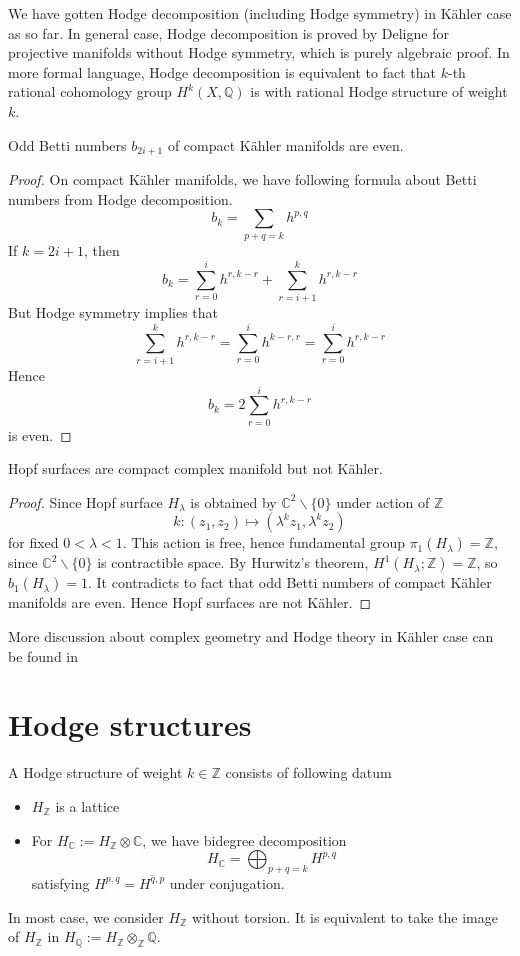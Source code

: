 \documentclass[11pt,oneside,a4paper]{amsbook}
\begin{document}
We have gotten Hodge decomposition (including Hodge symmetry) in K\"ahler case as so far. In general case, Hodge decomposition is proved by Deligne for projective manifolds without Hodge symmetry, which is purely algebraic proof. In more formal language, Hodge decomposition is equivalent to fact that $k$-th rational cohomology group $H^k(X, \mathbb{Q})$ is with rational Hodge structure of weight $k$.
\begin{secprop}
	Odd Betti numbers $b_{2i+1}$ of compact K\"ahler manifolds are even.
\end{secprop}
\begin{proof}
	On compact K\"ahler manifolds, we have following formula about Betti numbers from Hodge decomposition.
	\begin{equation}
		b_{k}= \sum_{p+q=k}h^{p,q}
	\end{equation}
	If $k=2i+1$, then 
	\[
	b_{k}= \sum_{r=0}^{i}h^{r,k-r} + \sum_{r=i+1}^{k}h^{r,k-r}
	\]
	But Hodge symmetry implies that 
	\[
	\sum_{r=i+1}^{k}h^{r,k-r}= \sum_{r=0}^{i}h^{k-r,r} =\sum_{r=0}^{i}h^{r,k-r}
	\]
	Hence 
	\[
	b_k= 2\sum_{r=0}^{i}h^{r,k-r}
	\]
	is even.
\end{proof}

\begin{seccor}
	Hopf surfaces are compact complex manifold but not K\"ahler.
\end{seccor}
\begin{proof}
	Since Hopf surface $H_\lambda$ is obtained by $\mathbb{C}^2 \backslash\{0\}$ under action of $\mathbb{Z}$
	\[
	k : (z_1, z_2) \mapsto (\lambda^k z_1, \lambda^k z_2)
	\]
	for fixed $0 < \lambda <1$.
	This action is free, hence fundamental group $\pi_1(H_\lambda)= \mathbb{Z}$, since $\mathbb{C}^2\backslash\{0\}$ is contractible space. By Hurwitz's theorem, $H^1(H_\lambda;\mathbb{Z})= \mathbb{Z}$, so $b_1(H_\lambda)=1$. It contradicts to fact that odd Betti numbers of compact K\"ahler manifolds are even. Hence Hopf surfaces are not K\"ahler. 
\end{proof}

\begin{rem}
	More discussion about complex geometry and Hodge theory in K\"ahler case can be found in \cite{Huybrechts2004,Griffiths1994}
\end{rem}
\section{Hodge structures}
\begin{secdefn}
A Hodge structure of weight $k \in \mathbb{Z}$ consists of following datum
\begin{itemize}
\item $H_{\mathbb{Z}}$ is a lattice
\item For $H_{\mathbb{C}}:= H_{\mathbb{Z}} \otimes \mathbb{C}$, we have bidegree decomposition
\[
H_{\mathbb{C}}= \bigoplus_{p+q=k} H^{p,q}
\]
satisfying $H^{p,q}= \overline{H^{q,p}}$ under conjugation.
\end{itemize}
\end{secdefn}
In most case, we consider $H_{\mathbb{Z}}$ without torsion. It is equivalent to take the image of $H_{\mathbb{Z}}$ in $H_{\mathbb{Q}}:= H_{\mathbb{Z}}\otimes_{\mathbb{Z}} \mathbb{Q}$.
\end{document}
